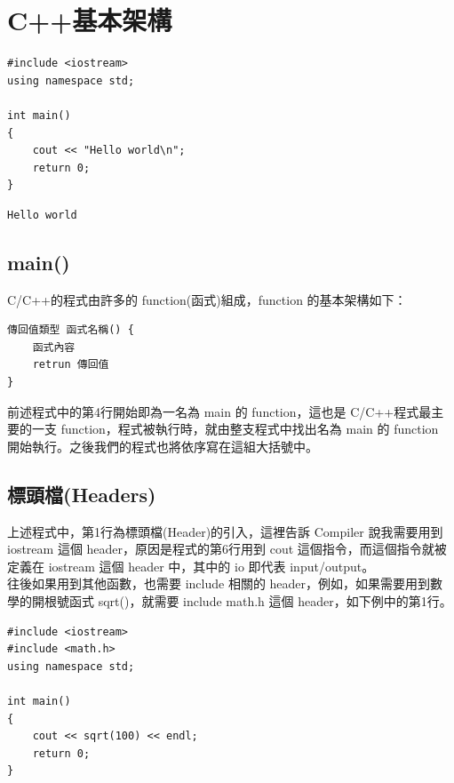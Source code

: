 \documentclass[a4paper,12pt]{article}
\begin{document}
\begin{enumerate}
\newpage
\end{enumerate}

\section{C++基本架構}
\label{cpp_arch}
\lstset{breaklines=true,language=cpp,label= ,caption= ,captionpos=b,firstnumber=1,numbers=left}
\begin{lstlisting}
#include <iostream>
using namespace std;

int main()
{
    cout << "Hello world\n";
    return 0;
}
\end{lstlisting}

\begin{verbatim}
Hello world
\end{verbatim}
\subsection{main()}
\label{sec:orgd2a3743}
C/C++的程式由許多的 function(函式)組成，function 的基本架構如下：\\
\lstset{breaklines=true,language=cpp,label= ,caption= ,captionpos=b,numbers=none}
\begin{lstlisting}
傳回值類型 函式名稱() {
    函式內容
    retrun 傳回值
}
\end{lstlisting}
前述程式中的第4行開始即為一名為 main 的 function，這也是 C/C++程式最主要的一支 function，程式被執行時，就由整支程式中找出名為 main 的 function 開始執行。之後我們的程式也將依序寫在這組大括號中。\\

\subsection{標頭檔(Headers)}
\label{sec:orga4f5fe6}
上述程式中，第1行為標頭檔(Header)的引入，這裡告訴 Compiler 說我需要用到 iostream 這個 header，原因是程式的第6行用到 cout 這個指令，而這個指令就被定義在 iostream 這個 header 中，其中的 io 即代表 input/output。\\

往後如果用到其他函數，也需要 include 相關的 header，例如，如果需要用到數學的開根號函式 sqrt()，就需要 include math.h 這個 header，如下例中的第1行。\\
\lstset{breaklines=true,language=cpp,label= ,caption= ,captionpos=b,firstnumber=1,numbers=left}
\begin{lstlisting}
#include <iostream>
#include <math.h>
using namespace std;

int main()
{
    cout << sqrt(100) << endl;
    return 0;
}

\end{lstlisting}
\end{document}
